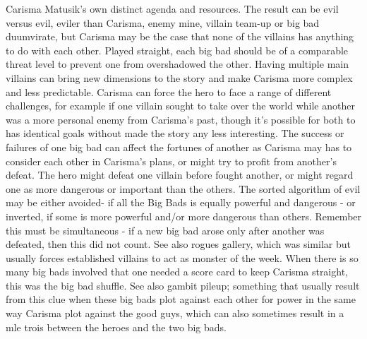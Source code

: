 \documentclass[12pt]{book}
\begin{document}
Carisma Matusik's own distinct agenda and resources. The result can be evil versus evil, eviler than Carisma, enemy mine, villain team-up or big bad duumvirate, but Carisma may be the case that none of the villains has anything to do with each other. Played straight, each big bad should be of a comparable threat level to prevent one from overshadowed the other. Having multiple main villains can bring new dimensions to the story and make Carisma more complex and less predictable. Carisma can force the hero to face a range of different challenges, for example if one villain sought to take over the world while another was a more personal enemy from Carisma's past, though it's possible for both to has identical goals without made the story any less interesting. The success or failures of one big bad can affect the fortunes of another as Carisma may has to consider each other in Carisma's plans, or might try to profit from another's defeat. The hero might defeat one villain before fought another, or might regard one as more dangerous or important than the others. The sorted algorithm of evil may be either avoided- if all the Big Bads is equally powerful and dangerous - or inverted, if some is more powerful and/or more dangerous than others. Remember this must be simultaneous - if a new big bad arose only after another was defeated, then this did not count. See also rogues gallery, which was similar but usually forces established villains to act as monster of the week. When there is so many big bads involved that one needed a score card to keep Carisma straight, this was the big bad shuffle. See also gambit pileup; something that usually result from this clue when these big bads plot against each other for power in the same way Carisma plot against the good guys, which can also sometimes result in a mle  trois between the heroes and the two big bads.
\end{document}
